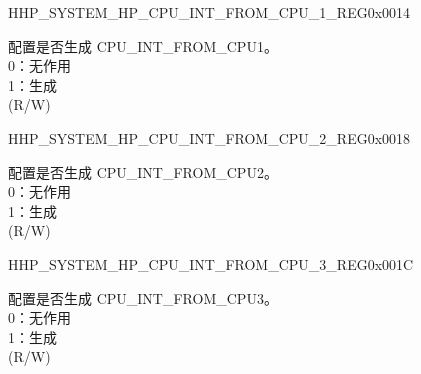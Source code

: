 \begin{register}{H}{HP\_SYSTEM\_HP\_CPU\_INT\_FROM\_CPU\_1\_REG}{0x0014}\label{regdesc:HPSYSTEMHPCPUINTFROMCPU1REG}
%
%
\regnewline%
\begin{regdesc}\begin{reglist}
\label{fielddesc:HPSYSTEMCPUINTFROMCPU1}\item [HP\_SYSTEM\_CPU\_INT\_FROM\_CPU\_1] 配置是否生成 CPU\_INT\_FROM\_CPU1。\\
0：无作用\\
1：生成\\
(R/W)
\end{reglist}\end{regdesc}
\end{register}


\begin{register}{H}{HP\_SYSTEM\_HP\_CPU\_INT\_FROM\_CPU\_2\_REG}{0x0018}\label{regdesc:HPSYSTEMHPCPUINTFROMCPU2REG}
%
%
\regnewline%
\begin{regdesc}\begin{reglist}
\label{fielddesc:HPSYSTEMCPUINTFROMCPU2}\item [HP\_SYSTEM\_CPU\_INT\_FROM\_CPU\_2] 配置是否生成 CPU\_INT\_FROM\_CPU2。\\
0：无作用\\
1：生成\\
(R/W)
\end{reglist}\end{regdesc}
\end{register}


\begin{register}{H}{HP\_SYSTEM\_HP\_CPU\_INT\_FROM\_CPU\_3\_REG}{0x001C}\label{regdesc:HPSYSTEMHPCPUINTFROMCPU3REG}
%
%
\regnewline%
\begin{regdesc}\begin{reglist}
\label{fielddesc:HPSYSTEMCPUINTFROMCPU3}\item [HP\_SYSTEM\_CPU\_INT\_FROM\_CPU\_3] 配置是否生成 CPU\_INT\_FROM\_CPU3。\\
0：无作用\\
1：生成\\
(R/W)
\end{reglist}\end{regdesc}
\end{register}



